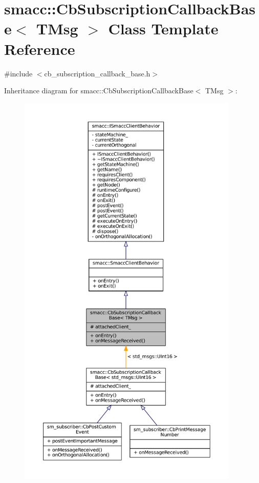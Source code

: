 \hypertarget{classsmacc_1_1CbSubscriptionCallbackBase}{}\section{smacc\+:\+:Cb\+Subscription\+Callback\+Base$<$ T\+Msg $>$ Class Template Reference}
\label{classsmacc_1_1CbSubscriptionCallbackBase}


{\ttfamily \#include $<$cb\+\_\+subscription\+\_\+callback\+\_\+base.\+h$>$}



Inheritance diagram for smacc\+:\+:Cb\+Subscription\+Callback\+Base$<$ T\+Msg $>$\+:
\nopagebreak
\begin{figure}[H]
\begin{center}
\leavevmode
\includegraphics[height=550pt]{classsmacc_1_1CbSubscriptionCallbackBase__inherit__graph}
\end{center}
\end{figure}


